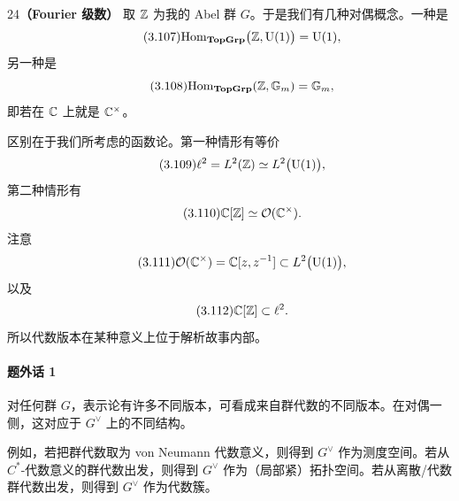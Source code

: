 \begin{srcex}{24}\textbf{（Fourier 级数）}
取 $\mathbb{Z}$ 为我的 Abel 群 $G$。于是我们有几种对偶概念。一种是
\begin{equation}\tag{3.107}
\mathrm{Hom}_{\mathbf{TopGrp}}\bigl(\mathbb{Z},\mathrm{U}(1)\bigr)=\mathrm{U}(1),
\end{equation}
另一种是
\begin{equation}\tag{3.108}
\mathrm{Hom}_{\mathbf{TopGrp}}(\mathbb{Z},\mathbb{G}_m)=\mathbb{G}_m,
\end{equation}
即若在 $\mathbb{C}$ 上就是 $\mathbb{C}^{\times}$。

区别在于我们所考虑的函数论。第一种情形有等价
\begin{equation}\tag{3.109}
\ell^2=L^2(\mathbb{Z})\simeq L^2\bigl(\mathrm{U}(1)\bigr),
\end{equation}
第二种情形有
\begin{equation}\tag{3.110}
\mathbb{C}[\mathbb{Z}]\simeq\mathcal{O}(\mathbb{C}^{\times}).
\end{equation}
注意
\begin{equation}\tag{3.111}
\mathcal{O}(\mathbb{C}^{\times})=\mathbb{C}[z,z^{-1}]\subset L^2\bigl(\mathrm{U}(1)\bigr),
\end{equation}
以及
\begin{equation}\tag{3.112}
\mathbb{C}[\mathbb{Z}]\subset\ell^2.
\end{equation}
所以代数版本在某种意义上位于解析故事内部。
\end{srcex}

\paragraph{题外话 1}
对任何群 $G$，表示论有许多不同版本，可看成来自群代数的不同版本。在对偶一侧，这对应于 $G^{\vee}$ 上的不同结构。

例如，若把群代数取为 von Neumann 代数意义，则得到 $G^{\vee}$ 作为测度空间。若从 $C^{*}$-代数意义的群代数出发，则得到 $G^{\vee}$ 作为（局部紧）拓扑空间。若从离散/代数群代数出发，则得到 $G^{\vee}$ 作为代数簇。

